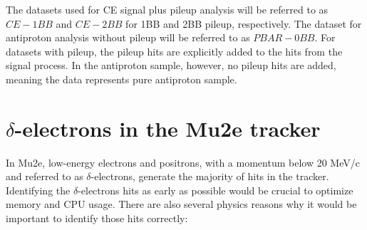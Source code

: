 The datasets used for CE signal plus pileup 
analysis will be referred to as $CE-1BB$ and $CE-2BB$ 
for 1BB and 2BB pileup, respectively. The dataset for 
antiproton analysis without pileup will be 
referred to as $PBAR-0BB$.
For datasets with pileup, 
the pileup hits are explicitly added to the hits from 
the signal process. In the antiproton sample, however, 
no pileup hits are added, meaning the data represents 
pure antiproton sample. 
\section{$\delta$-electrons in the Mu2e tracker}\label{trackerdeltas}

In Mu2e, low-energy electrons 
and positrons, with a momentum below 20 MeV/c and 
referred to as $\delta$-electrons, 
generate the majority of hits in the tracker. 
Identifying the $\delta$-electrons hits as early 
as possible would be crucial to optimize memory 
and CPU usage. There are also several physics 
reasons why it would be important to identify 
those hits correctly:
